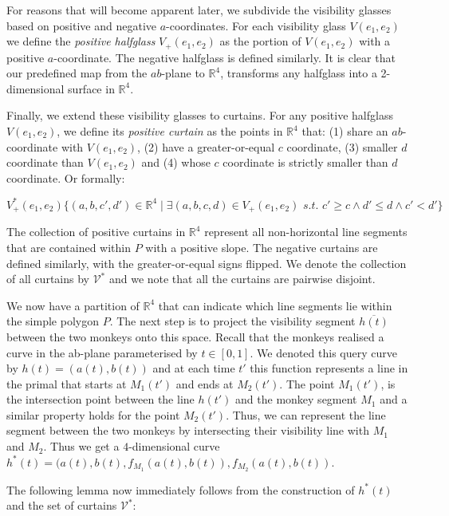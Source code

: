 \documentclass{article}
\begin{document}
For reasons that will become apparent later, we subdivide the visibility glasses based on positive and negative $a$-coordinates. For each visibility glass $V(e_1, e_2)$ we define the \emph{positive halfglass} $V_+(e_1, e_2)$ as the portion of $V(e_1, e_2)$ with a positive $a$-coordinate. The negative halfglass is defined similarly. It is clear that our predefined map from the $ab$-plane to $\mathbb{R}^4$, transforms any halfglass into a 2-dimensional surface in $\mathbb{R}^4$.

Finally, we extend these visibility glasses to curtains. For any positive halfglass $V(e_1, e_2)$, we define its \emph{positive curtain} as the points in $\mathbb{R}^4$ that: (1) share an $ab$-coordinate with $V(e_1, e_2)$, (2) have a greater-or-equal $c$ coordinate, (3) smaller $d$ coordinate than $V(e_1, e_2)$ and (4) whose $c$ coordinate is strictly smaller than $d$ coordinate. Or formally:

\begin{equation}
    V^*_+(e_1, e_2) \{ (a,b, c', d') \in \mathbb{R}^4 \mid \exists (a,b,c,d) \in V_+(e_1, e_2) \textit{ s.t. } c' \ge c \wedge d' \le d \wedge c' < d' \}
\end{equation} 

The collection of positive curtains in $\mathbb{R}^4$ represent all non-horizontal line segments that are contained within $P$ with a positive slope. The negative curtains are defined similarly, with the greater-or-equal signs flipped. We denote the collection of all curtains by $\mathcal{V}^*$ and we note that all the curtains are pairwise disjoint. 

We now have a partition of $\mathbb{R}^4$ that can indicate which line segments lie within the simple polygon $P$. The next step is to project the visibility segment $\overline{h(t)}$ between the two monkeys onto this space. Recall that the monkeys realised a curve in the ab-plane parameterised by $t \in [0,1]$. We denoted this query curve by $h(t) = (a(t), b(t))$ and at each time $t'$ this function represents a line in the primal that starts at $M_1(t')$ and ends at $M_2(t')$. The point $M_1(t')$, is the intersection point between the line $h(t')$ and the monkey segment $M_1$ and a similar property holds for the point $M_2(t')$. Thus, we can represent the line segment between the two monkeys by intersecting their visibility line with $M_1$ and $M_2$. Thus we get a $4$-dimensional curve $h^*(t) = (a(t), b(t), f_{M_1}(a(t), b(t)), f_{M_2}(a(t), b(t))$. 

The following lemma now immediately follows from the construction of $h^*(t)$ and the set of curtains $\mathcal{V}^*$:
\end{document}
